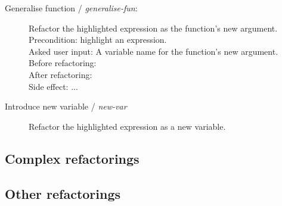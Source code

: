 \begin{description}
	\item[Generalise function / \textit{generalise-fun}:] 
	Refactor the highlighted expression as the function's new argument. 
	\\Precondition: highlight an expression.
	\\Asked user input: A variable name for the function's new argument. 
	\\Before refactoring:
	\\After refactoring:
	\\Side effect: ...
	\item[Introduce new variable / \textit{new-var}] Refactor the highlighted expression as a new variable.
\end{description}

\subsection{Complex refactorings}


\subsection{Other refactorings}

